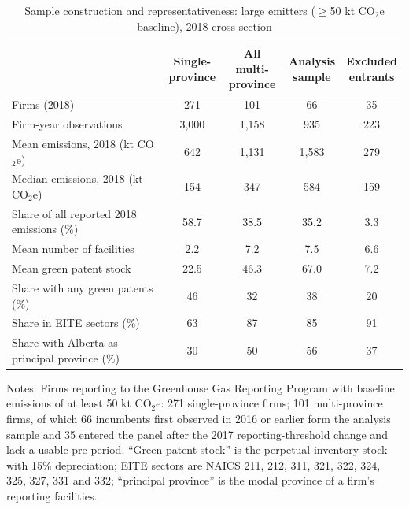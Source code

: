 \begin{table}[htbp]\centering\small
\caption{Sample construction and representativeness: large emitters ($\geq$50 kt CO$_2$e baseline), 2018 cross-section}
\label{tab:sample}
\begin{tabular}{lcccc}
\toprule
 & \makecell{Single-\\province} & \makecell{All multi-\\province} & \makecell{Analysis\\sample} & \makecell{Excluded\\entrants} \\
\midrule
Firms (2018) & 271 & 101 & 66 & 35 \\
Firm-year observations & 3,000 & 1,158 & 935 & 223 \\
Mean emissions, 2018 (kt CO$_2$e) & 642 & 1,131 & 1,583 & 279 \\
Median emissions, 2018 (kt CO$_2$e) & 154 & 347 & 584 & 159 \\
Share of all reported 2018 emissions (\%) & 58.7 & 38.5 & 35.2 & 3.3 \\
Mean number of facilities & 2.2 & 7.2 & 7.5 & 6.6 \\
Mean green patent stock & 22.5 & 46.3 & 67.0 & 7.2 \\
Share with any green patents (\%) & 46 & 32 & 38 & 20 \\
Share in EITE sectors (\%) & 63 & 87 & 85 & 91 \\
Share with Alberta as principal province (\%) & 30 & 50 & 56 & 37 \\
\bottomrule
\end{tabular}
\par\vspace{3pt}\begin{minipage}{\textwidth}\footnotesize
Notes: Firms reporting to the Greenhouse Gas Reporting Program with baseline emissions of at least 50 kt CO$_2$e: 271 single-province firms; 101 multi-province firms, of which 66 incumbents first observed in 2016 or earlier form the analysis sample and 35 entered the panel after the 2017 reporting-threshold change and lack a usable pre-period. ``Green patent stock'' is the perpetual-inventory stock with 15\% depreciation; EITE sectors are NAICS 211, 212, 311, 321, 322, 324, 325, 327, 331 and 332; ``principal province'' is the modal province of a firm's reporting facilities.
\end{minipage}
\end{table}

